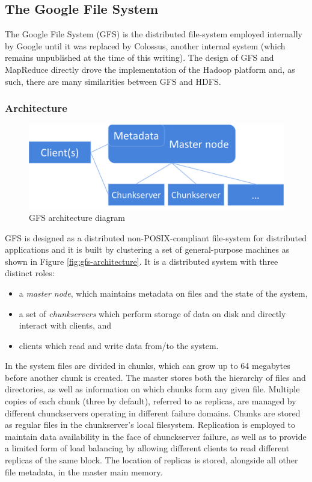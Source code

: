 \subsection{The Google File System}
The Google File System (GFS) \cite{DBLP:conf/sosp/GhemawatGL03} is the distributed file-system employed internally by Google until it was replaced by Colossus, another internal system (which remains unpublished at the time of this writing). 
The design of GFS and MapReduce \cite{DBLP:journals/cacm/DeanG08} directly drove the implementation of the Hadoop platform and, as such, there are many similarities between GFS and HDFS.

\subsubsection{Architecture}
\begin{figure}[h]
\caption{GFS architecture diagram}
\label{fig:hdfs-block-diagram}
\centering
\includegraphics[width=1.0\textwidth]{images/gfs-block-diagram.png}
\end{figure}

GFS is designed as a distributed non-POSIX-compliant file-system for distributed applications and it is built by clustering a set of general-purpose machines as shown in Figure \ref{fig:gfs-architecture}.
It is a distributed system with three distinct roles: 
\begin{itemize}
    \item a \emph{master node}, which maintains metadata on files and the state of the system,
    \item a set of \emph{chunkservers} which perform storage of data on disk and directly interact with clients, and
    \item clients which read and write data from/to the system.
\end{itemize}
In the system files are divided in chunks, which can grow up to 64 megabytes before another chunk is created.
The master stores both the hierarchy of files and directories, as well as information on which chunks form any given file.
Multiple copies of each chunk (three by default), referred to as replicas, are managed by different chunckservers operating in different failure domains.
Chunks are stored as regular files in the chunkserver's local filesystem.
Replication is employed to maintain data availability in the face of chunckserver failure, as well as to provide a limited form of load balancing by allowing different clients to read different replicas of the same block.
The location of replicas is stored, alongside all other file metadata, in the master main memory.

